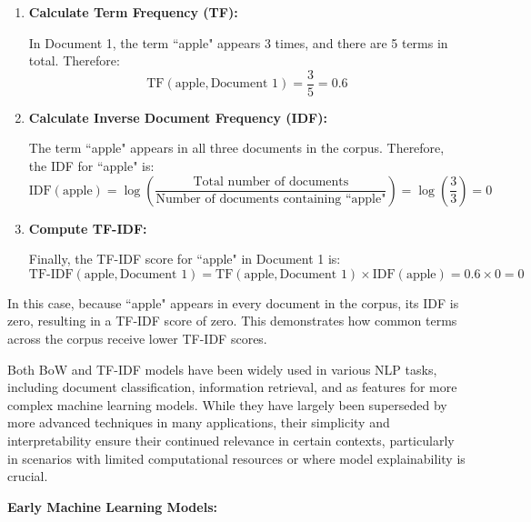 \begin{enumerate}
    \item \textbf{Calculate Term Frequency (TF):}
    
    In Document 1, the term ``apple" appears 3 times, and there are 5 terms in total. Therefore:
    \[
    \text{TF}(\text{apple}, \text{Document 1}) = \frac{3}{5} = 0.6
    \]

    \item \textbf{Calculate Inverse Document Frequency (IDF):}
    
    The term ``apple" appears in all three documents in the corpus. Therefore, the IDF for ``apple" is:
    \[
    \text{IDF}(\text{apple}) = \log\left(\frac{\text{Total number of documents}}{\text{Number of documents containing ``apple"}}\right) = \log\left(\frac{3}{3}\right) = 0
    \]

    \item \textbf{Compute TF-IDF:}
    
    Finally, the TF-IDF score for ``apple" in Document 1 is:
    \[
    \text{TF-IDF}(\text{apple}, \text{Document 1}) = \text{TF}(\text{apple}, \text{Document 1}) \times \text{IDF}(\text{apple}) = 0.6 \times 0 = 0
    \]
\end{enumerate}

In this case, because ``apple" appears in every document in the corpus, its IDF is zero, resulting in a TF-IDF score of zero. This demonstrates how common terms across the corpus receive lower TF-IDF scores.



Both BoW and TF-IDF models have been widely used in various NLP tasks, including document classification, information retrieval, and as features for more complex machine learning models. While they have largely been superseded by more advanced techniques in many applications, their simplicity and interpretability ensure their continued relevance in certain contexts, particularly in scenarios with limited computational resources or where model explainability is crucial.

\textbf{Early Machine Learning Models:} %

